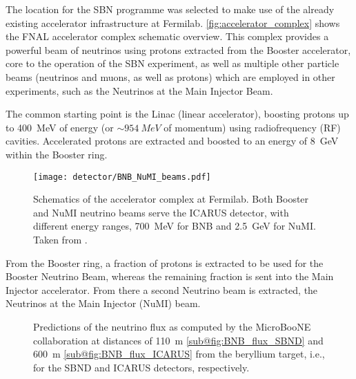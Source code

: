 The location for the SBN programme was selected to make use of the already existing accelerator infrastructure at Fermilab. \autoref{fig:accelerator_complex} shows the FNAL accelerator complex schematic overview. This complex provides a powerful beam of neutrinos using protons extracted from the Booster accelerator, core to the operation of the SBN experiment, as well as multiple other particle beams (neutrinos and muons, as well as protons) which are employed in other experiments, such as the Neutrinos at the Main Injector Beam. 

The common starting point is the Linac (linear accelerator), boosting protons up to \SI{400}{MeV} of energy (or $\sim\SI{954}{MeV}$ of momentum) using radiofrequency (RF) cavities. Accelerated protons are extracted and boosted to an energy of \SI{8}{GeV} within the Booster ring. 

\begin{figure}
    \centering
    \texttt{[image: detector/BNB\_NuMI\_beams.pdf]}
    \caption[Fermilab Accelerator complex]{Schematics of the accelerator complex at Fermilab. Both Booster and NuMI neutrino beams serve the ICARUS detector, with different energy  ranges, \SI{700}{MeV} for BNB and \SI{2.5}{GeV} for NuMI. Taken from \cite{ainsworthHighIntensityOperation2020}.}
    \label{fig:accelerator_complex}
\end{figure}

From the Booster ring, a fraction of protons is extracted to be used for the Booster Neutrino Beam, whereas the remaining fraction is sent into the Main Injector accelerator. From there a second Neutrino beam is extracted, the Neutrinos at the Main Injector (NuMI) beam. 

\begin{figure}
    \centering

    \caption[BNB flux predictions at the near and far detectors]{Predictions of the neutrino flux as computed by the MicroBooNE collaboration \cite{miniboonecollaborationNeutrinoFluxPrediction2009} at distances of \SI{110}{m} \ref{sub@fig:BNB_flux_SBND} and \SI{600}{m} \ref{sub@fig:BNB_flux_ICARUS} from the beryllium target, i.e., for the SBND and ICARUS detectors, respectively. }
    \label{fig:BNB_flux}
\end{figure}

